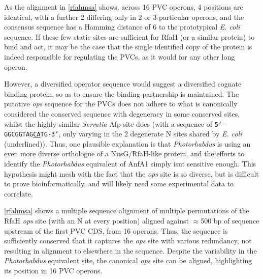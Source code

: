 As the alignment in \vref{rfahmsa} shows, across 16 PVC operons, 4 positions are identical, with a further 2 differing only in 2 or 3 particular operons, and the consensus sequence has a Hamming distance of 6 to the prototypical \emph{E. coli} sequence. If these few static sites are sufficient for RfaH (or a similar protein) to bind and act, it may be the case that the single identified copy of the protein is indeed responsible for regulating the PVCs, as it would for any other long operon.

However, a diversified operator sequence would suggest a diversified cognate binding protein, so as to ensure the binding partnership is maintained. The putative \emph{ops} sequence for the PVCs does not adhere to what is canonically considered the conserved sequence with degeneracy in some conserved sites, whilst the highly similar \emph{Serratia} Afp site does (with a sequence of \texttt{5'-GGCGGTAG\underline{CA}TG-3'}, only varying in the 2 degenerate N sites shared by \emph{E. coli} (underlined)). Thus, one plausible explanation is that \emph{Photorhabdus} is using an even more diverse orthologue of a NusG/RfaH-like protein, and the efforts to identify the \emph{Photorhabdus} equivalent of AnfA1 simply isnt sensitive enough. This hypothesis might mesh with the fact that the \emph{ops} site is so diverse, but is difficult to prove bioinformatically, and will likely need some experimental data to correlate.

\vref{rfahmsa} shows a multiple sequence alignment of multiple permutations of the RfaH \emph{ops} site (with an N at every position) aligned against $\approx$500 bp of sequence upstream of the first PVC CDS, from 16 operons. Thus, the sequence is sufficiently conserved that it captures the \emph{ops} site with various redundancy, not resulting in alignment to elsewhere in the sequence. Despite the variability in the \emph{Photorhabdus} equivalent site, the canonical \emph{ops} site can be aligned, highlighting its position in 16 PVC operons.

